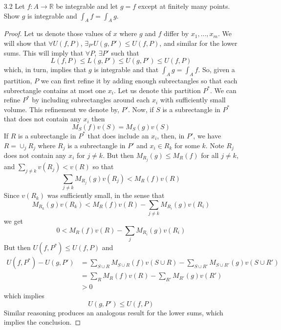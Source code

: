 \begin{enumerate}
    \item[3.2] Let \( f: A \rightarrow \mathbb{R} \) be integrable and let \( g=f \) except at finitely many points. Show \( g \) is integrable and \( \int_A f = \int_A g \).
    \begin{proof}
    Let us denote those values of \( x \) where \( g \) and \( f \) differ by \( x_1,\ldots,x_m \). We will show that \( \forall U(f,P) \), \( \exists_{P'} U(g,P') \leq U(f,P) \), and similar for the lower sums. This will imply that \( \forall P \), \( \exists P' \) such that
    \[
    L(f,P) \leq L(g, P') \leq U(g,P') \leq U(f,P)
    \]
    which, in turn, implies that \( g \) is integrable and that \( \int_A g = \int_A f \). So, given a partition, \( P \) we can first refine it by adding enough subrectangles so that each subrectangle contains at most one \( x_i \). Let us denote this partition \( P^* \). We can refine \( P^* \) by including subrectangles around each \( x_i \) with sufficiently small volume. This refinement we denote by,  \( P' \). Now, if \( S \) is a subrectangle in \( P^* \) that does not contain any \( x_i \) then 
    \[
    M_S(f)v(S) = M_S(g)v(S)
    \]
    If \( R \) is a subrectangle in \( P^* \) that does include an \( x_i \), then, in \( P' \), we have \linebreak \( R = \cup_j R_j \) where \( R_j \) is a subrectangle in  \( P' \) and \( x_i \in R_k \) for some \( k \). Note \( R_j \) does not contain any \( x_i \) for \( j \neq k \). But then \( M_{R_j}(g) \leq M_R(f) \) for all \( j \neq k \), and \( \sum_{j\neq k} v(R_j) < v(R) \) so that
    \[
    \sum_{j \neq k}M_{R_j}(g)v(R_j) < M_R(f)v(R)
    \]
    Since \( v(R_k) \) was sufficiently small, in the sense that
    \[
    M_{R_k}(g)v(R_k) < M_R(f)v(R) - \sum_{j \neq k}M_{R_i}(g)v(R_i)
    \]
    we get
    \[
    0 < M_R(f)v(R) - \sum_{j}M_{R_i}(g)v(R_i)
    \]
    But then \( U(f,P^*) \leq U(f, P) \) and
    \begin{align*}
        U(f, P^*) - U(g,P') &= \sum_{S \cup R} M_{S \cup R}(f)v(S \cup R) - \sum_{S \cup R'} M_{S \cup R'}(g)v(S \cup R') \\
        &= \sum_R M_R(f)v(R) - \sum_{R'}M_{R'}(g)v(R') \\
        &> 0 
    \end{align*}
    which implies
    \[
    U(g,P') \leq U(f, P)
    \]
    Similar reasoning produces an analogous result for the lower sums, which implies the conclusion. 
    \end{proof}
    

\end{enumerate}
